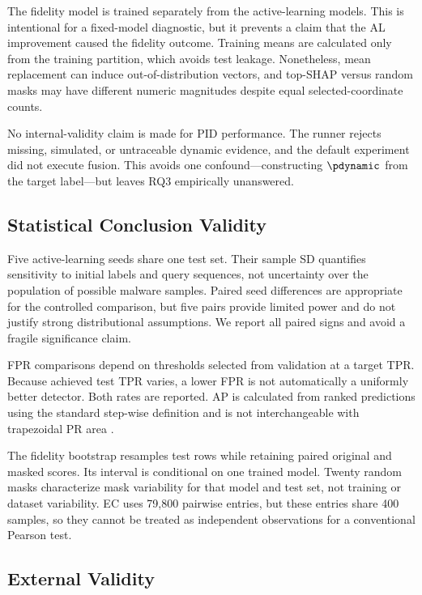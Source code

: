 The fidelity model is trained separately from the active-learning models. This
is intentional for a fixed-model diagnostic, but it prevents a claim that the AL
improvement caused the fidelity outcome. Training means are calculated only from
the training partition, which avoids test leakage. Nonetheless, mean replacement
can induce out-of-distribution vectors, and top-SHAP versus random masks may have
different numeric magnitudes despite equal selected-coordinate counts.

No internal-validity claim is made for PID performance. The runner rejects
missing, simulated, or untraceable dynamic evidence, and the default experiment
did not execute fusion. This avoids one confound---constructing $\pdynamic$ from
the target label---but leaves RQ3 empirically unanswered.

\subsection{Statistical Conclusion Validity}

Five active-learning seeds share one test set. Their sample SD quantifies
sensitivity to initial labels and query sequences, not uncertainty over the
population of possible malware samples. Paired seed differences are appropriate
for the controlled comparison, but five pairs provide limited power and do not
justify strong distributional assumptions. We report all paired signs and avoid
a fragile significance claim.

FPR comparisons depend on thresholds selected from validation at a target TPR.
Because achieved test TPR varies, a lower FPR is not automatically a uniformly
better detector. Both rates are reported. AP is calculated from ranked
predictions using the standard step-wise definition and is not interchangeable
with trapezoidal PR area \cite{saito2015precision}.

The fidelity bootstrap resamples test rows while retaining paired original and
masked scores. Its interval is conditional on one trained model. Twenty random
masks characterize mask variability for that model and test set, not training or
dataset variability. EC uses 79,800 pairwise entries, but these entries share 400
samples, so they cannot be treated as independent observations for a conventional
Pearson test.

\subsection{External Validity}

